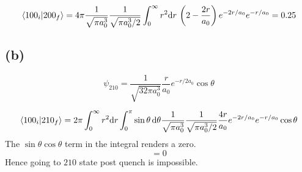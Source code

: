 \documentclass[letter, 10pts]{article}
\begin{document}
\[
	\braket{100_i | 200_f} 
	=
	4\pi 
	\frac{1}{\sqrt{\pi a_0^3} } 
	\frac{1}{\sqrt{\pi a_0^3 / 2 }  }
	\int_{0}^{\infty} r^2 \mathrm{d} r \, 
	\left(2 - \frac{2r }{a_0}\right) e^{- 2 r / a_0} e^{-r / a_0} = 0.25
\] 




\subsection*{(b)} 
\[
	\psi_{210} =
	\frac{1}{\sqrt{32 \pi a_0^3} } 
	\frac{r}{a_0} e^{- r / 2 a_0} \cos \theta 
\] 

\[
\braket{100_i | 210_f} = 
2 \pi 
\int_{0}^{\infty} r^2 \mathrm{d} r 
\int_{0}^{\pi } \sin \theta \, \mathrm{d} \theta 
\frac{1}{\sqrt{\pi a_0^3} } 
\frac{1}{\sqrt{ \pi a_0^3 / 2}} 
\frac{4r}{a_0} e^{ - 2 r / a_0} e^{ - r / a_0} \cos \theta 
\] 
The $\sin \theta \cos \theta$ term in the integral renders a zero. 
\[
 = 0
\] 
Hence going to $210$ state post quench is impossible. 
\end{document}
